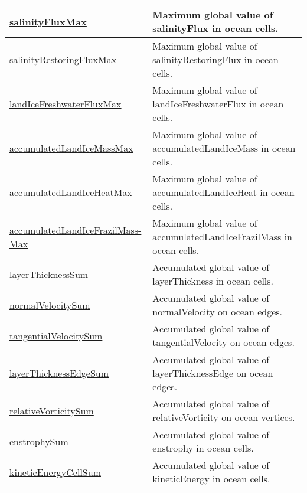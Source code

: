 {\begin{center}
\begin{longtable}{| p{2.0in} | p{4.0in} |}
    \hline
    \hyperref[subsec:var_sec_globalStatsAM_salinityFluxMax]{salinityFluxMax} & Maximum global value of salinityFlux in ocean cells. \\
    \hline
    \hyperref[subsec:var_sec_globalStatsAM_salinityRestoringFluxMax]{salinityRestoringFluxMax} & Maximum global value of salinityRestoringFlux in ocean cells. \\
    \hline
    \hyperref[subsec:var_sec_globalStatsAM_landIceFreshwaterFluxMax]{landIceFreshwaterFluxMax} & Maximum global value of landIceFreshwaterFlux in ocean cells. \\
    \hline
    \hyperref[subsec:var_sec_globalStatsAM_accumulatedLandIceMassMax]{accumulatedLandIceMassMax} & Maximum global value of accumulatedLandIceMass in ocean cells. \\
    \hline
    \hyperref[subsec:var_sec_globalStatsAM_accumulatedLandIceHeatMax]{accumulatedLandIceHeatMax} & Maximum global value of accumulatedLandIceHeat in ocean cells. \\
    \hline
    \hyperref[subsec:var_sec_globalStatsAM_accumulatedLandIceFrazilMassMax]{accumulatedLandIceFrazilMass-}\hyperref[subsec:var_sec_globalStatsAM_accumulatedLandIceFrazilMassMax]{Max}  & Maximum global value of accumulatedLandIceFrazilMass in ocean cells. \\
    \hline
    \hyperref[subsec:var_sec_globalStatsAM_layerThicknessSum]{layerThicknessSum} & Accumulated global value of layerThickness in ocean cells. \\
    \hline
    \hyperref[subsec:var_sec_globalStatsAM_normalVelocitySum]{normalVelocitySum} & Accumulated global value of normalVelocity on ocean edges. \\
    \hline
    \hyperref[subsec:var_sec_globalStatsAM_tangentialVelocitySum]{tangentialVelocitySum} & Accumulated global value of tangentialVelocity on ocean edges. \\
    \hline
    \hyperref[subsec:var_sec_globalStatsAM_layerThicknessEdgeSum]{layerThicknessEdgeSum} & Accumulated global value of layerThicknessEdge on ocean edges. \\
    \hline
    \hyperref[subsec:var_sec_globalStatsAM_relativeVorticitySum]{relativeVorticitySum} & Accumulated global value of relativeVorticity on ocean vertices. \\
    \hline
    \hyperref[subsec:var_sec_globalStatsAM_enstrophySum]{enstrophySum} & Accumulated global value of enstrophy in ocean cells. \\
    \hline
    \hyperref[subsec:var_sec_globalStatsAM_kineticEnergyCellSum]{kineticEnergyCellSum} & Accumulated global value of kineticEnergy in ocean cells. \\

\end{longtable}
\end{center}}
